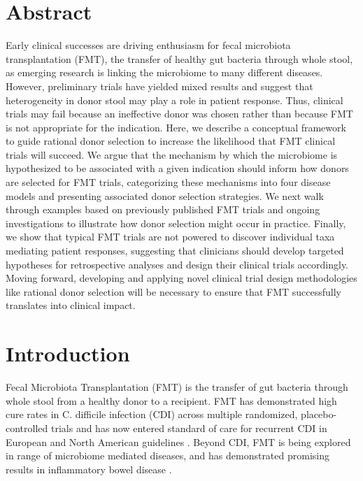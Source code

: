 \section*{Abstract}

Early clinical successes are driving enthusiasm for fecal microbiota transplantation (FMT), the transfer of healthy gut bacteria through whole stool, as emerging research is linking the microbiome to many different diseases.
However, preliminary trials have yielded mixed results and suggest that heterogeneity in donor stool may play a role in patient response.
Thus, clinical trials may fail because an ineffective donor was chosen rather than because FMT is not appropriate for the indication.
Here, we describe a conceptual framework to guide rational donor selection to increase the likelihood that FMT clinical trials will succeed.
We argue that the mechanism by which the microbiome is hypothesized to be associated with a given indication should inform how donors are selected for FMT trials, categorizing these mechanisms into four disease models and presenting associated donor selection strategies.
We next walk through examples based on previously published FMT trials and ongoing investigations to illustrate how donor selection might occur in practice.
Finally, we show that typical FMT trials are not powered to discover individual taxa mediating patient responses, suggesting that clinicians should develop targeted hypotheses for retrospective analyses and design their clinical trials accordingly.
Moving forward, developing and applying novel clinical trial design methodologies like rational donor selection will be necessary to ensure that FMT successfully translates into clinical impact.


\newpage

\section{Introduction}

Fecal Microbiota Transplantation (FMT) is the transfer of gut bacteria through whole stool from a healthy donor to a recipient.
FMT has demonstrated high cure rates in C. difficile infection (CDI) across multiple randomized, placebo-controlled trials \cite{Quraishi2017} and has now entered standard of care for recurrent CDI in European and North American guidelines \cite{McDonald2018,Cammarota2017,Surawicz2013}.
Beyond CDI, FMT is being explored in range of microbiome mediated diseases, and has demonstrated promising results in inflammatory bowel disease \cite{Panchal2018,Gelfand2018,Kootte2017,Osman2018,Costello2017,Paramsothy2017}.

